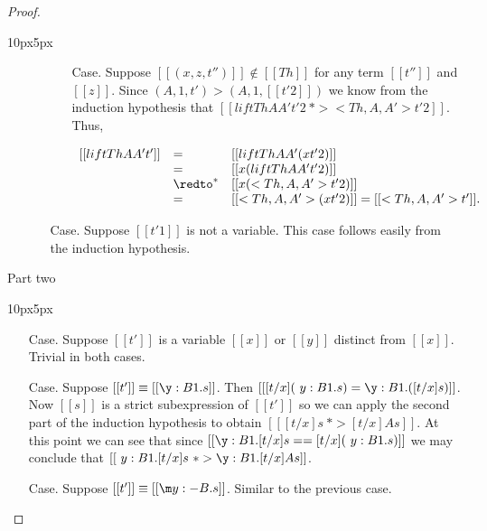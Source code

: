 \begin{proof}
\begin{changemargin}{10px}{5px}
\begin{itemize}
\begin{itemize}
\begin{itemize}
      \item[Case.] Suppose $[[(x,z,t'')]] \not \in [[Th]]$ for any term $[[t'']]$ and $[[z]]$.  
        Since $(A,1,t') > (A,1,[[t'2]])$ we know from the 
        induction hypothesis that $[[lift Th A A' t'2 ~*> <Th,A,A'>t'2]]$.  Thus,
        \begin{center}
          \begin{math}
            \begin{array}{lll}
              [[lift Th A A' t']] & = & [[lift Th A A' (x t'2)]]\\ 
              & = & [[x (lift Th A A' t'2)]]\\ 
              & \redto^* & [[x (<Th,A,A'>t'2)]]\\
              & = & [[<Th,A,A'> (x t'2)]] = [[<Th,A,A'>t']].
            \end{array}
          \end{math}
        \end{center}
      \end{itemize}
    \item[Case.] Suppose $[[t'1]]$ is not a variable.  This case follows easily from
      the induction hypothesis.
    \end{itemize}
  \end{itemize}
  \end{changemargin}

  \noindent Part two
  \vspace{-25px}
  \begin{changemargin}{10px}{5px}\noindent
  \begin{itemize}
  \item[Case.] Suppose $[[t']]$ is a variable $[[x]]$ or $[[y]]$ distinct from $[[x]]$.  
    Trivial in both cases.
    
  \item[Case.] Suppose $[[t']] \equiv [[\y:B1.s]]$.  Then
    $[[ [t/x] (\ y:B1.s) = \y:B1.([t/x] s)]]$. 
    Now $[[s]]$ is a strict subexpression of $[[t']]$ so we can apply the second part of the induction hypothesis to obtain 
    $[[ [t/x]s ~*> [t/x] A s]]$.  At this point we can see that since 
    $[[\y:B1.[t/x]s == [t/x](\ y:B1.s)]]$ we may
    conclude that $[[\ y:B1.[t/x]s ~*> \y:B1.[t/x] A s]]$.

  \item[Case.] Suppose $[[t']] \equiv [[\m y:{-B}.s]]$.  Similar to the previous case.


\end{itemize}
\end{changemargin}
\end{proof}
